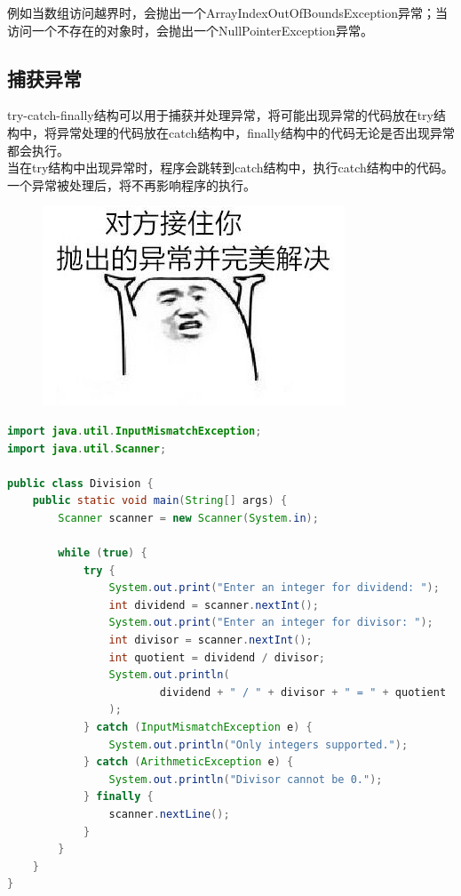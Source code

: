 例如当数组访问越界时，会抛出一个ArrayIndexOutOfBoundsException异常；当访问一个不存在的对象时，会抛出一个NullPointerException异常。\\

\subsection{捕获异常}

try-catch-finally结构可以用于捕获并处理异常，将可能出现异常的代码放在try结构中，将异常处理的代码放在catch结构中，finally结构中的代码无论是否出现异常都会执行。\\

当在try结构中出现异常时，程序会跳转到catch结构中，执行catch结构中的代码。一个异常被处理后，将不再影响程序的执行。\\

\begin{figure}[H]
    \centering
    \includegraphics{img/Chapter7/7-1/1.png}
\end{figure}


\begin{lstlisting}[language=Java]
import java.util.InputMismatchException;
import java.util.Scanner;

public class Division {
    public static void main(String[] args) {
        Scanner scanner = new Scanner(System.in);

        while (true) {
            try {
                System.out.print("Enter an integer for dividend: ");
                int dividend = scanner.nextInt();
                System.out.print("Enter an integer for divisor: ");
                int divisor = scanner.nextInt();
                int quotient = dividend / divisor;
                System.out.println(
                        dividend + " / " + divisor + " = " + quotient
                );
            } catch (InputMismatchException e) {
                System.out.println("Only integers supported.");
            } catch (ArithmeticException e) {
                System.out.println("Divisor cannot be 0.");
            } finally {
                scanner.nextLine();
            }
        }
    }
}
\end{lstlisting}

